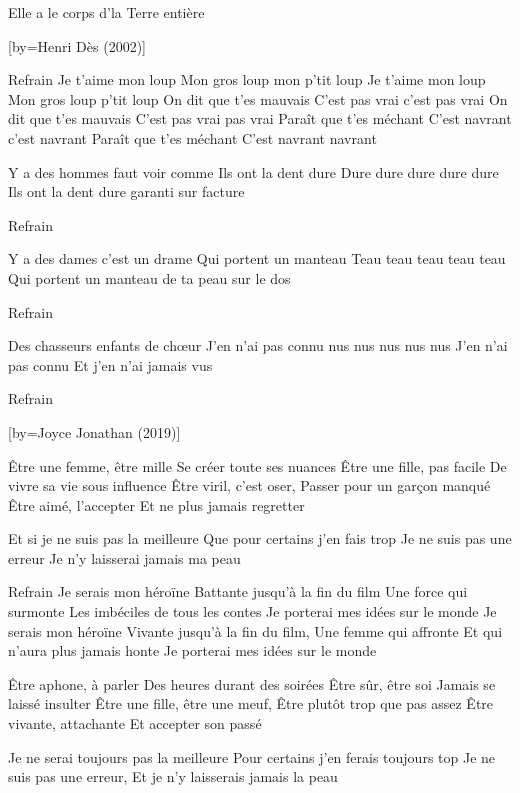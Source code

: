 \beginverse
Elle a le corps d’la Terre entière
\endverse

[by={Henri Dès (2002)}]

\beginverse
Refrain
Je t'aime mon loup
Mon gros loup mon p'tit loup
Je t'aime mon loup
Mon gros loup p'tit loup
On dit que t'es mauvais
C'est pas vrai c'est pas vrai
On dit que t'es mauvais
C'est pas vrai pas vrai
Paraît que t'es méchant
C'est navrant c'est navrant
Paraît que t'es méchant
C'est navrant navrant
\endverse

\beginverse
Y a des hommes faut voir comme
Ils ont la dent dure
Dure dure dure dure dure
Ils ont la dent dure garanti sur facture
\endverse

\beginverse
Refrain
\endverse

\beginverse
Y a des dames c'est un drame
Qui portent un manteau
Teau teau teau teau teau
Qui portent un manteau de ta peau sur le dos
\endverse

\beginverse
Refrain
\endverse

\beginverse
Des chasseurs enfants de chœur
J'en n'ai pas connu nus nus nus nus nus
J'en n'ai pas connu
Et j'en n'ai jamais vus
\endverse

\beginverse
Refrain
\endverse

[by={Joyce Jonathan (2019)}]

\beginverse
Être une femme, être mille
Se créer toute ses nuances
Être une fille, pas facile
De vivre sa vie sous influence
Être viril, c’est oser,
Passer pour un garçon manqué
Être aimé, l’accepter
Et ne plus jamais regretter
\endverse

\beginverse
Et si je ne suis pas la meilleure
Que pour certains j’en fais trop
Je ne suis pas une erreur
Je n’y laisserai jamais ma peau
\endverse

\beginverse
Refrain
Je serais mon héroïne
Battante jusqu’à la fin du film
Une force qui surmonte
Les imbéciles de tous les contes
Je porterai mes idées sur le monde
Je serais mon héroïne
Vivante jusqu’à la fin du film,
Une femme qui affronte
Et qui n’aura plus jamais honte
Je porterai mes idées sur le monde
\endverse

\beginverse
Être aphone, à parler
Des heures durant des soirées
Être sûr, être soi
Jamais se laissé insulter
Être une fille, être une meuf,
Être plutôt trop que pas assez
Être vivante, attachante
Et accepter son passé
\endverse

\beginverse
Je ne serai toujours pas la meilleure
Pour certains j’en ferais toujours top
Je ne suis pas une erreur,
Et je n’y laisserais jamais la peau
\endverse

